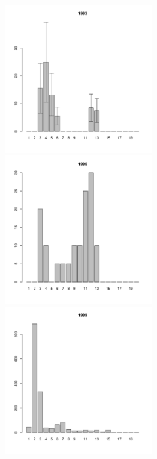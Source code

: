 \documentclass[12pt, a4paper]{article}
\begin{document}
\begin{figure}[h]
\begin{multicols}{3}
\end{multicols}



\begin{multicols}{3}
\hfill
\includegraphics[width=65mm]{../White_Sea/Luvenga_Goreliy/high_1993_.pdf}
\hfill
\includegraphics[width=65mm]{../White_Sea/Luvenga_Goreliy/high_1996_.pdf}
\hfill
\includegraphics[width=65mm]{../White_Sea/Luvenga_Goreliy/high_1999_.pdf}

\end{multicols}



\end{figure}
\end{document}

